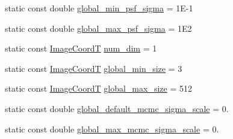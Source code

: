 \begin{DoxyCompactItemize}
\item 
static const double \hyperlink{classmappel_1_1PointEmitterModel_a77d0ca98d77cb8b94117ece2a5b182a4}{global\+\_\+min\+\_\+psf\+\_\+sigma} = 1\+E-\/1
\item 
static const double \hyperlink{classmappel_1_1PointEmitterModel_a5e79dba8966c25c4e9c675cd1a2cab70}{global\+\_\+max\+\_\+psf\+\_\+sigma} = 1\+E2
\item 
static const \hyperlink{classmappel_1_1ImageFormat1DBase_a82ab3168eb1a87eaeb3e7c919188e9fc}{Image\+CoordT} \hyperlink{classmappel_1_1ImageFormat1DBase_af81159de9010c3618d2f69349c1f2368}{num\+\_\+dim} = 1
\item 
static const \hyperlink{classmappel_1_1ImageFormat1DBase_a82ab3168eb1a87eaeb3e7c919188e9fc}{Image\+CoordT} \hyperlink{classmappel_1_1ImageFormat1DBase_a27c75df8b3d83856d7c2c42ee987af89}{global\+\_\+min\+\_\+size} = 3
\item 
static const \hyperlink{classmappel_1_1ImageFormat1DBase_a82ab3168eb1a87eaeb3e7c919188e9fc}{Image\+CoordT} \hyperlink{classmappel_1_1ImageFormat1DBase_a5aafad20e635eae6f3609af56abad3ad}{global\+\_\+max\+\_\+size} = 512
\item 
static const double \hyperlink{classmappel_1_1MCMCAdaptorBase_a44cebca0e27135c854fa8430d2d89929}{global\+\_\+default\+\_\+mcmc\+\_\+sigma\+\_\+scale} = 0.
\item 
static const double \hyperlink{classmappel_1_1MCMCAdaptorBase_aebc93881ca351e67de867238a62579eb}{global\+\_\+max\+\_\+mcmc\+\_\+sigma\+\_\+scale} = 0.
\end{DoxyCompactItemize}
